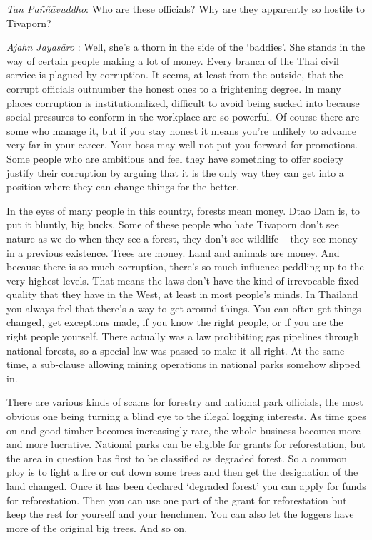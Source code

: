 \emph{Tan Paññāvuddho}: Who are these officials? Why are they apparently
so hostile to Tivaporn?

\emph{Ajahn Jayasāro }: Well, she's a thorn in the side of the
`baddies'. She stands in the way of certain people making a lot of
money. Every branch of the Thai civil service is plagued by corruption.
It seems, at least from the outside, that the corrupt officials
outnumber the honest ones to a frightening degree. In many places
corruption is institutionalized, difficult to avoid being sucked into
because social pressures to conform in the workplace are so powerful. Of
course there are some who manage it, but if you stay honest it means
you're unlikely to advance very far in your career. Your boss may well
not put you forward for promotions. Some people who are ambitious and
feel they have something to offer society justify their corruption by
arguing that it is the only way they can get into a position where they
can change things for the better.

In the eyes of many people in this country, forests mean money. Dtao Dam
is, to put it bluntly, big bucks. Some of these people who hate Tivaporn
don't see nature as we do when they see a forest, they don't see
wildlife -- they see money in a previous existence. Trees are money.
Land and animals are money. And because there is so much corruption,
there's so much influence-peddling up to the very highest levels. That
means the laws don't have the kind of irrevocable fixed quality that
they have in the West, at least in most people's minds. In Thailand you
always feel that there's a way to get around things. You can often get
things changed, get exceptions made, if you know the right people, or if
you are the right people yourself. There actually was a law prohibiting
gas pipelines through national forests, so a special law was passed to
make it all right. At the same time, a sub-clause allowing mining
operations in national parks somehow slipped in.

There are various kinds of scams for forestry and national park
officials, the most obvious one being turning a blind eye to the illegal
logging interests. As time goes on and good timber becomes increasingly
rare, the whole business becomes more and more lucrative. National parks
can be eligible for grants for reforestation, but the area in question
has first to be classified as degraded forest. So a common ploy is to
light a fire or cut down some trees and then get the designation of the
land changed. Once it has been declared `degraded forest' you can apply
for funds for reforestation. Then you can use one part of the grant for
reforestation but keep the rest for yourself and your henchmen. You can
also let the loggers have more of the original big trees. And so on.

